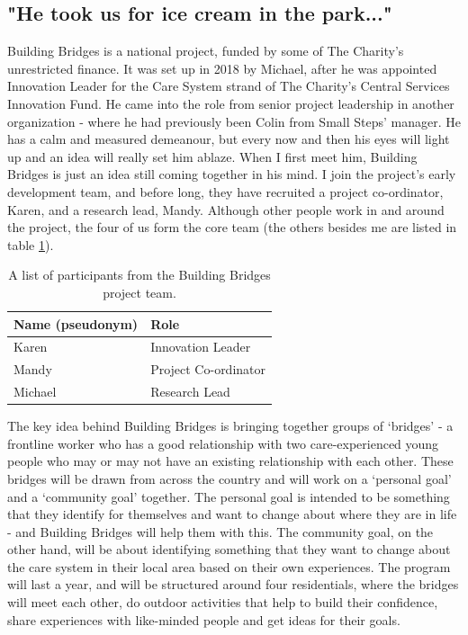 \subsection{"He took us for ice cream in the park..."}
\label{sec:4-building}
Building Bridges is a national project, funded by some of The Charity's unrestricted finance. It was set up in 2018 by Michael, after he was appointed Innovation Leader for the Care System strand of The Charity's Central Services Innovation Fund. He came into the role from senior project leadership in another organization - where he had previously been Colin from Small Steps' manager. He has a calm and measured demeanour, but every now and then his eyes will light up and an idea will really set him ablaze. When I first meet him, Building Bridges is just an idea still coming together in his mind. I join the project's early development team, and before long, they have recruited a project co-ordinator, Karen, and a research lead, Mandy. Although other people work in and around the project, the four of us form the core team (the others besides me are listed in table \ref{tab:building-bridges-participants}). 

\begin{table}[hbt!]
\centering
\begin{tabular}{|l|l|} \hline 
\textbf{Name (pseudonym)} & \textbf{Role}                    \\ \hline 
Karen& Innovation Leader\\ \hline 
Mandy& Project Co-ordinator\\ \hline 
Michael& Research Lead\\\hline\end{tabular}

\caption{A list of participants from the Building Bridges project team.}
\label{tab:building-bridges-participants}
\end{table}

The key idea behind Building Bridges is bringing together groups of `bridges' - a frontline worker who has a good relationship with two care-experienced young people who may or may not have an existing relationship with each other. These bridges will be drawn from across the country and will work on a `personal goal' and  a `community goal' together. The personal goal is intended to be something that they identify for themselves and want to change about where they are in life - and Building Bridges will help them with this. The community goal, on the other hand, will be about identifying something that they want to change about the care system in their local area based on their own experiences. The program will last a year, and will be structured around four residentials, where the bridges will meet each other, do outdoor activities that help to build their confidence, share experiences with like-minded people and get ideas for their goals. 

